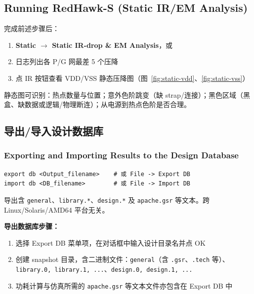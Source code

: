\subsection*{Running RedHawk-S (Static IR/EM Analysis)}

完成前述步骤后：
\begin{enumerate}
  \item \textbf{Static $\rightarrow$ Static IR-drop \& EM Analysis}，或 
  \item 日志列出各 P/G 网最差 5 个压降
  \item 点 IR 按钮查看 VDD/VSS 静态压降图（图~\ref{fig:static-vdd}、\ref{fig:static-vss}）
\end{enumerate}

\label{fig:static-vdd}
\label{fig:static-vss}

静态图可识别：热点数量与位置；意外色阶跳变（缺 strap/连接）；黑色区域（黑盒、缺数据或逻辑/物理断连）；从电源到热点色阶是否合理。

\subsection{导出/导入设计数据库}
\subsubsection*{Exporting and Importing Results to the Design Database}

\begin{lstlisting}
export db <Output_filename>    # 或 File -> Export DB
import db <DB_filename>        # 或 File -> Import DB
\end{lstlisting}

导出含 \texttt{general}、\texttt{library.*}、\texttt{design.*} 及 \texttt{apache.gsr} 等文本。跨 Linux/Solaris/AMD64 平台无关。

\textbf{导出数据库步骤：}
\begin{enumerate}
  \item 选择 Export DB 菜单项，在对话框中输入设计目录名并点 OK
  \item 创建 snapshot 目录，含二进制文件：\texttt{general}（含 \texttt{.gsr}、\texttt{.tech} 等）、\texttt{library.0, library.1, ...}、\texttt{design.0, design.1, ...}
  \item 功耗计算与仿真所需的 \texttt{apache.gsr} 等文本文件亦包含在 Export DB 中
\end{enumerate}

